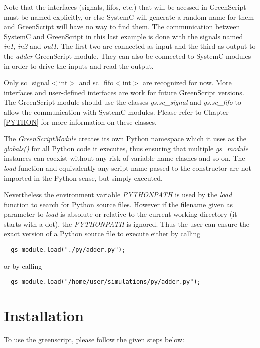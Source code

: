\documentclass[12pt,oneside]{gsbook}
\begin{document}
Note that the interfaces (signals, fifos, etc.) that will be acessed
in GreenScript must be named explicitly, or else SystemC will generate
a random name for them and GreenScript will have no way to find
them. The communication between SystemC and GreenScript in this last
example is done with the signals named \textit{in1}, \textit{in2} and
\textit{out1}. The first two are connected as input and the third as
output to the \textit{adder} GreenScript module. They can also be
connected to SystemC modules in order to drive the inputs and read the
output.

Only sc\_signal$<$int$>$ and sc\_fifo$<$int$>$ are recognized for
now. More interfaces and user-defined interfaces are work for future
GreenScript versions.  The GreenScript module should use the classes
\textit{gs.sc\_signal} and \textit{gs.sc\_fifo} to allow the
communication with SystemC modules. Please refer to Chapter
\ref{PYTHON} for more information on these classes.

The \textit{GreenScriptModule} creates its own Python namespace which it uses
as the \textit{globals()} for all Python code it executes, thus ensuring
that multiple \textit{gs\_module} instances can coexist without any risk
of variable name clashes and so on.  The \textit{load} function and
equivalently any script name passed to the constructor are not imported
in the Python sense, but simply executed.

Nevertheless the environment variable \textit{PYTHONPATH} is used by
the \textit{load} function to search for Python source files.  However if the
filename given as parameter to \textit{load} is absolute or relative to
the current working directory (it starts with a dot), the \textit{PYTHONPATH}
is ignored.  Thus the user can ensure the exact version of a Python
source file to execute either by calling
\lstset{language=C++}
\begin{lstlisting}
  gs_module.load("./py/adder.py");
\end{lstlisting}
or by calling
\begin{lstlisting}
  gs_module.load("/home/user/simulations/py/adder.py");
\end{lstlisting}
\lstset{language=Python}

\section{Installation}

To use the greenscript, please follow the given steps below:
\end{document}
